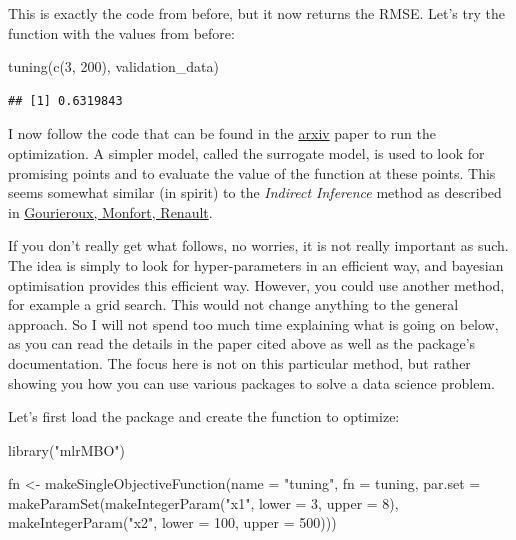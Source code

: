 \documentclass[
]{article}
\newenvironment{Shaded}{\begin{snugshade}}{\end{snugshade}}
\newcommand{\AttributeTok}[1]{\textcolor[rgb]{0.77,0.63,0.00}{#1}}
\newcommand{\DecValTok}[1]{\textcolor[rgb]{0.00,0.00,0.81}{#1}}
\newcommand{\FunctionTok}[1]{\textcolor[rgb]{0.00,0.00,0.00}{#1}}
\newcommand{\NormalTok}[1]{#1}
\newcommand{\OtherTok}[1]{\textcolor[rgb]{0.56,0.35,0.01}{#1}}
\newcommand{\StringTok}[1]{\textcolor[rgb]{0.31,0.60,0.02}{#1}}
\begin{document}
This is exactly the code from before, but it now returns the RMSE. Let's try the function
with the values from before:

\begin{Shaded}
\begin{Highlighting}[]
\FunctionTok{tuning}\NormalTok{(}\FunctionTok{c}\NormalTok{(}\DecValTok{3}\NormalTok{, }\DecValTok{200}\NormalTok{), validation\_data)}
\end{Highlighting}
\end{Shaded}

\begin{verbatim}
## [1] 0.6319843
\end{verbatim}

I now follow the code that can be found in the \href{https://arxiv.org/abs/1703.03373}{arxiv} paper to
run the optimization. A simpler model, called the surrogate model, is used to look for promising
points and to evaluate the value of the function at these points. This seems somewhat similar
(in spirit) to the \emph{Indirect Inference} method as described in
\href{https://www.jstor.org/stable/2285076}{Gourieroux, Monfort, Renault}.

If you don't really get what follows, no worries, it is not really important as such. The idea
is simply to look for hyper-parameters in an efficient way, and bayesian optimisation provides
this efficient way. However, you could use another method, for example a grid search. This would not
change anything to the general approach. So I will not spend too much time explaining what is
going on below, as you can read the details in the paper cited above as well as the package's
documentation. The focus here is not on this particular method, but rather showing you how you can
use various packages to solve a data science problem.

Let's first load the package and create the function to optimize:

\begin{Shaded}
\begin{Highlighting}[]
\FunctionTok{library}\NormalTok{(}\StringTok{"mlrMBO"}\NormalTok{)}
\end{Highlighting}
\end{Shaded}

\begin{Shaded}
\begin{Highlighting}[]
\NormalTok{fn }\OtherTok{\textless{}{-}} \FunctionTok{makeSingleObjectiveFunction}\NormalTok{(}\AttributeTok{name =} \StringTok{"tuning"}\NormalTok{,}
                                 \AttributeTok{fn =}\NormalTok{ tuning,}
                                 \AttributeTok{par.set =} \FunctionTok{makeParamSet}\NormalTok{(}\FunctionTok{makeIntegerParam}\NormalTok{(}\StringTok{"x1"}\NormalTok{, }\AttributeTok{lower =} \DecValTok{3}\NormalTok{, }\AttributeTok{upper =} \DecValTok{8}\NormalTok{),}
                                                        \FunctionTok{makeIntegerParam}\NormalTok{(}\StringTok{"x2"}\NormalTok{, }\AttributeTok{lower =} \DecValTok{100}\NormalTok{, }\AttributeTok{upper =} \DecValTok{500}\NormalTok{)))}
\end{Highlighting}
\end{Shaded}
\end{document}
